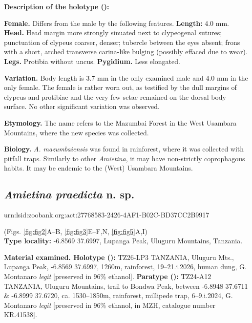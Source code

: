 \documentclass[fleqn,10pt,lineno]{wlpeerj}
\begin{document}
\textbf{Description of the holotype (\male):}




\textbf{Female.} Differs from the male by the following features. \textbf{Length:} 4.0 mm. \textbf{Head.} Head margin more strongly sinuated next to clypeogenal sutures; punctuation of clypeus coarser, denser; tubercle between the eyes absent; frons with a short, arched transverse carina-like bulging (possibly effaced due to wear). \textbf{Legs.} Protibia without uncus. \textbf{ Pygidium.} Less elongated.

\textbf{Variation.} Body length is 3.7 mm in the only examined male and 4.0 mm in the only female. The female is rather worn out, as testified by the dull margins of clypeus and protibiae and the very few setae remained on the dorsal body surface. No other significant variation was observed.

\textbf{Etymology.} The name refers to the Mazumbai Forest in the West Usambara Mountains, where the new species was collected.

\textbf{Biology.} \textit{A. mazumbaiensis} was found in rainforest, where it was collected with pitfall traps. Similarly to other \textit{Amietina}, it may have non-strictly coprophagous habits. It may be endemic to the (West) Usambara Mountains.



\subsection*{\textbf{\textit{Amietina praedicta} n. sp.}}

urn:lsid:zoobank.org:act:27768583-2426-4AF1-B02C-BD37CC2B9917

(Figs. \ref{fig:fig2}A--B, \ref{fig:fig3}E--F,N, \ref{fig:fig5}A,I)\\

\textbf{Type locality:} -6.8569 37.6997, Lupanga Peak, Uluguru Mountains, Tanzania.

\textbf{Material examined. Holotype (\male):} TZ26-LP3 TANZANIA, Uluguru Mts., Lupanga Peak, -6.8569 37.6997, 1260m, rainforest, 19--21.i.2026, human dung, G. Montanaro \textit{legit} [preserved in 96\% ethanol]. \textbf{Paratype (\female):} TZ24-A12 TANZANIA, Uluguru Mountains, trail to Bondwa Peak, between -6.8948 37.6711 \& -6.8999 37.6720, ca. 1530–1850m, rainforest, millipede trap, 6–9.i.2024, G. Montanaro \textit{legit} [preserved in 96\% ethanol, in MZH, catalogue number KR.41538].
\end{document}
